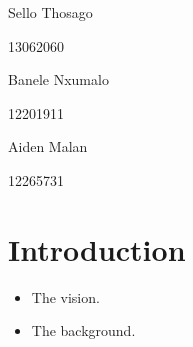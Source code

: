 \documentclass[hidelinks,a4paper,12pt]{article}
\begin{document}
\begin{titlepage}
\begin{center}
			\begin{minipage}{0.4\textwidth}
				\begin{flushleft} \large
					Sello {Thosago}
				\end{flushleft}
			\end{minipage}
			\begin{minipage}{0.4\textwidth}
				\begin{flushright} \large
					\emph{}
					13062060
				\end{flushright}
			\end{minipage}
			
			\begin{minipage}{0.4\textwidth}
				\begin{flushleft} \large
					Banele {Nxumalo}
				\end{flushleft}
			\end{minipage}
			\begin{minipage}{0.4\textwidth}
				\begin{flushright} \large
					\emph{}
					12201911
				\end{flushright}
			\end{minipage}
			
			\begin{minipage}{0.4\textwidth}
				\begin{flushleft} \large
					Aiden {Malan}
				\end{flushleft}
			\end{minipage}
			\begin{minipage}{0.4\textwidth}
				\begin{flushright} \large
					\emph{}
					12265731
				\end{flushright}
			\end{minipage}
			
			
			\vfill
			
		\end{center}
	\end{titlepage}
	\footnotesize
	\normalsize
	
	
	\tableofcontents
	\newpage
	
	\newpage %
	\section{Introduction} 
	\begin{itemize} 
		\item The vision.
		\item The background.
	\end{itemize}
	
\end{document}
